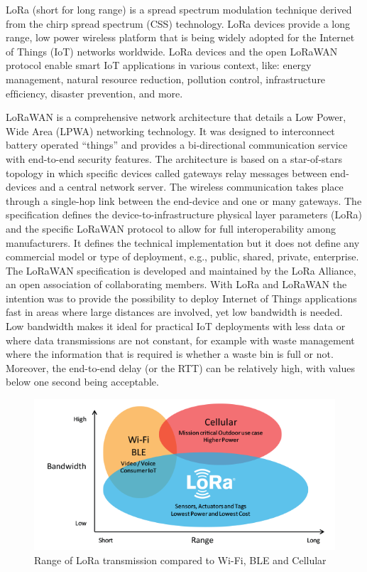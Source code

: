 			LoRa (short for long range) is a spread spectrum modulation
			technique derived from the chirp spread spectrum (CSS)
			technology. LoRa devices provide a long range, low power
			wireless platform that is being widely adopted for the Internet
			of Things (IoT) networks worldwide. LoRa devices and the
			open LoRaWAN protocol enable smart IoT applications in
			various context, like: energy management, natural resource
			reduction, pollution control, infrastructure efﬁciency, disaster
			prevention, and more.

			LoRaWAN is a comprehensive network architecture that details a Low Power, Wide Area (LPWA) networking technology.
			It was designed to interconnect battery operated “things” and
			provides a bi-directional communication service with end-to-end security features. The architecture is based on a star-of-stars topology in which speciﬁc devices called gateways relay
			messages between end-devices and a central network server.
			The wireless communication takes place through a single-hop
			link between the end-device and one or many gateways.
			The speciﬁcation deﬁnes the device-to-infrastructure physical layer parameters (LoRa) and the speciﬁc LoRaWAN protocol to allow for full interoperability among manufacturers. It
			deﬁnes the technical implementation but it does not deﬁne any
			commercial model or type of deployment, e.g., public, shared,
			private, enterprise. The LoRaWAN speciﬁcation is developed
			and maintained by the LoRa Alliance, an open association
			of collaborating members. With LoRa and LoRaWAN the
			intention was to provide the possibility to deploy Internet of
			Things applications fast in areas where large distances are
			involved, yet low bandwidth is needed. Low bandwidth makes
			it ideal for practical IoT deployments with less data or where
			data transmissions are not constant, for example with waste
			management where the information that is required is whether
			a waste bin is full or not. Moreover, the end-to-end delay (or
			the RTT) can be relatively high, with values below one second
			being acceptable.
			
			\begin{figure}
				\centering
				\includegraphics[width=\textwidth]{resources/img/LoRa_Why_Range}
				\caption{Range of LoRa transmission compared to Wi-Fi, BLE and Cellular}
			\end{figure}
			
